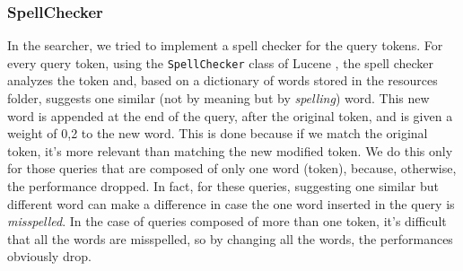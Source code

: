 \subsubsection{SpellChecker}
\label{subsubsec:spellchecker}

In the searcher, we tried to implement a spell checker for the query tokens.
For every query token, using the \texttt{SpellChecker} class of Lucene \citep{Lucene}, the spell checker analyzes the token and, based on a dictionary of words stored in the resources folder, suggests one similar (not by meaning but by \emph{spelling}) word.
This new word is appended at the end of the query, after the original token, and is given a weight of 0,2 to the new word. This is done because if we match the original token, it's more relevant than matching the new modified token.
We do this only for those queries that are composed of only one word (token), because, otherwise, the performance dropped.
In fact, for these queries, suggesting one similar but different word can make a difference in case the one word inserted in the query is \emph{misspelled}.
In the case of queries composed of more than one token, it's difficult that all the words are misspelled, so by changing all the words, the performances obviously drop.
